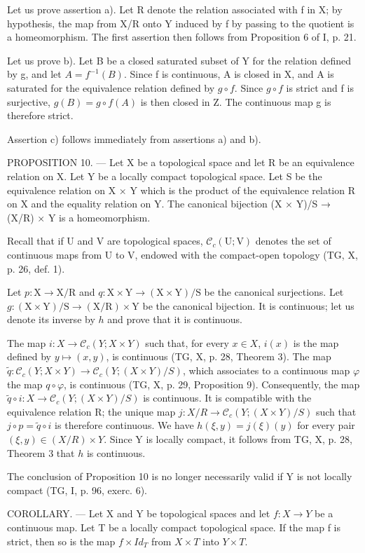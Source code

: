 Let us prove assertion a). Let R denote the relation associated with f in X; by hypothesis, the map from X/R onto Y induced by f by passing to the quotient is a homeomorphism. The first assertion then follows from Proposition 6 of I, p. 21.

Let us prove b). Let B be a closed saturated subset of Y for the relation defined by g, and let \(A = f^{-1}(B)\). Since f is continuous, A is closed in X, and A is saturated for the equivalence relation defined by \(g \circ f\). Since \(g \circ f\) is strict and f is surjective, \(g(B) = g \circ f(A)\) is then closed in Z. The continuous map g is therefore strict.

Assertion c) follows immediately from assertions a) and b).

PROPOSITION 10. --- Let X be a topological space and let R be an equivalence relation on X. Let Y be a locally compact topological space. Let S be the equivalence relation on X × Y which is the product of the equivalence relation R on X and the equality relation on Y. The canonical bijection (X × Y)/S → (X/R) × Y is a homeomorphism.

Recall that if U and V are topological spaces, \(\mathcal{C}_{c}(\mathrm{U};\mathrm{V})\) denotes the set of continuous maps from U to V, endowed with the compact-open topology (TG, X, p. 26, def. 1).

Let \(p \colon \mathrm{X} \to \mathrm{X} / \mathrm{R}\) and \(q \colon \mathrm{X} \times \mathrm{Y} \to (\mathrm{X} \times \mathrm{Y}) / \mathrm{S}\) be the canonical surjections. Let \(g \colon (\mathrm{X} \times \mathrm{Y}) / \mathrm{S} \to (\mathrm{X} / \mathrm{R}) \times \mathrm{Y}\) be the canonical bijection. It is continuous; let us denote its inverse by \(h\) and prove that it is continuous.

The map \(i\colon X \to \mathcal{C}_{c}(Y;X \times Y)\) such that, for every \(x \in X\), \(i(x)\) is the map defined by \(y \mapsto (x,y)\), is continuous (TG, X, p. 28, Theorem 3). The map \(\widetilde{q}\colon \mathcal{C}_{c}(Y;X \times Y) \to \mathcal{C}_{c}(Y;(X \times Y)/S)\), which associates to a continuous map \(\varphi\) the map \(q \circ \varphi\), is continuous (TG, X, p. 29, Proposition 9). Consequently, the map \(\widetilde{q} \circ i\colon X \to \mathcal{C}_{c}(Y;(X \times Y)/S)\) is continuous. It is compatible with the equivalence relation R; the unique map \(j\colon X/R \to \mathcal{C}_{c}(Y;(X \times Y)/S)\) such that \(j \circ p = \widetilde{q} \circ i\) is therefore continuous. We have \(h(\xi,y) = j(\xi)(y)\) for every pair \((\xi,y) \in (X/R) \times Y\). Since Y is locally compact, it follows from TG, X, p. 28, Theorem 3 that \(h\) is continuous.

The conclusion of Proposition 10 is no longer necessarily valid if Y is not locally compact (TG, I, p. 96, exerc. 6).

COROLLARY. --- Let X and Y be topological spaces and let \(f: X \to Y\) be a continuous map. Let T be a locally compact topological space. If the map f is strict, then so is the map \(f \times Id_{T}\) from \(X \times T\) into \(Y \times T\).


